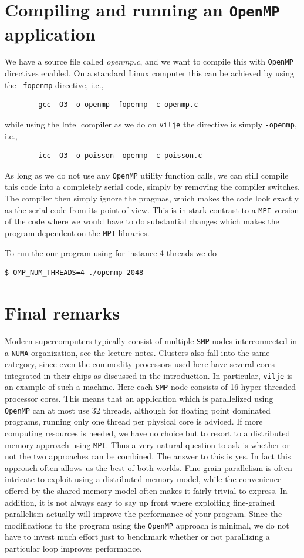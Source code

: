 \documentclass[twoside, 11pt, a4paper]{article}
\begin{document}
\section{Compiling and running an \texttt{OpenMP} application}
We have a source file called \emph{openmp.c}, and we want to compile this with \texttt{OpenMP} directives enabled.
On a standard Linux computer this can be achieved by using the \texttt{-fopenmp} directive, i.e.,
\begin{verbatim}
        gcc -O3 -o openmp -fopenmp -c openmp.c
\end{verbatim}
while using the Intel compiler as we do on \texttt{vilje} the directive is simply \texttt{-openmp}, i.e.,
\begin{verbatim}
        icc -O3 -o poisson -openmp -c poisson.c
\end{verbatim}
As long as we do not use any \texttt{OpenMP} utility function calls,
we can still compile this code into a completely serial code, simply by removing the compiler 
switches. The compiler then simply ignore the pragmas, which makes the code look exactly as the
serial code from its point of view. This is in stark contrast to a \texttt{MPI} version
of the code where we would have to do substantial changes which makes the program dependent on the \texttt{MPI} libraries.

To run the our program using for instance 4 threads we do
\begin{verbatim}
$ OMP_NUM_THREADS=4 ./openmp 2048
\end{verbatim}

\section{Final remarks}
Modern supercomputers typically consist of multiple \texttt{SMP} nodes interconnected in a
\texttt{NUMA} organization, see the lecture notes. Clusters also fall into the same category,
since even the commodity processors used here have several cores integrated in their chips
as discussed in the introduction. In particular, \texttt{vilje} is an example of such a machine.
Here each \texttt{SMP} node consists of 16 hyper-threaded processor cores. This means that an application which
is parallelized using \texttt{OpenMP} can at most use 32 threads, although for floating point dominated
programs, running only one thread per physical core is adviced. If more computing resources
is needed, we have no choice but to resort to a distributed memory approach using 
\texttt{MPI}. Thus a very natural question to ask is whether or not the two approaches can
be combined. The answer to this is yes. In fact this approach often allows us the best of
both worlds. Fine-grain parallelism is often intricate to exploit using a distributed memory 
model, while the convenience offered by the shared memory model often makes it fairly trivial
to express. In addition, it is not always easy to say up front where exploiting fine-grained
parallelism actually will improve the performance of your program.  Since the modifications
to the program using the \texttt{OpenMP} approach is minimal, we do not have to
invest much effort just to benchmark whether or not parallizing a particular loop improves
performance.
\end{document}
